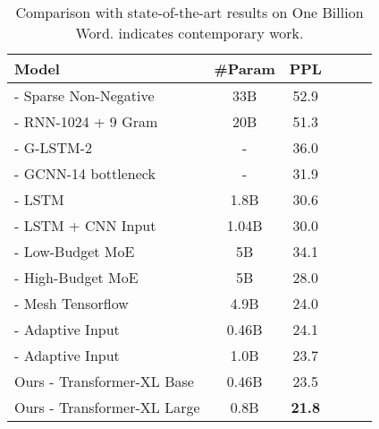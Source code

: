 \documentclass[11pt,a4paper]{article}
\begin{document}
\bgroup
\setlength{\tabcolsep}{2pt}
\begin{table}[t]
	\small
	\centering
	\begin{adjustwidth}{-4pt}{}
		
	\begin{tabular}{l|ccccc}
		\toprule
		\bf Model & \bf \#Param & \bf PPL \\
		\midrule
		\citet{shazeer2014skip} - Sparse Non-Negative & 33B & 52.9 \\
		\citet{chelba2013one} - RNN-1024 + 9 Gram & 20B & 51.3 \\
\citet{kuchaiev2017factorization} - G-LSTM-2 & - & 36.0 \\
		\citet{dauphin2016language} - GCNN-14 bottleneck & - & 31.9 \\
		\citet{jozefowicz2016exploring} - LSTM & 1.8B & 30.6 \\
		\citet{jozefowicz2016exploring} - LSTM + CNN Input & 1.04B & 30.0 \\
		\citet{shazeer2017outrageously} - Low-Budget MoE & 5B & 34.1 \\
		\citet{shazeer2017outrageously} - High-Budget MoE & 5B & 28.0 \\
\citet{shazeer2018mesh} - Mesh Tensorflow & 4.9B & 24.0 \\
		\citet{baevski2018adaptive} - Adaptive Input & 0.46B & 24.1 \\
		\citet{baevski2018adaptive} - Adaptive Input & 1.0B & 23.7 \\
		\midrule
		Ours - Transformer-XL Base & 0.46B & 23.5 \\
		Ours - Transformer-XL Large & 0.8B & \textbf{21.8} \\
		\bottomrule
	\end{tabular}
	\caption{\small
		Comparison with state-of-the-art results on One Billion Word.  indicates contemporary work.
	}
	\label{table:lm1b}
	\end{adjustwidth}
\end{table}
\end{document}
